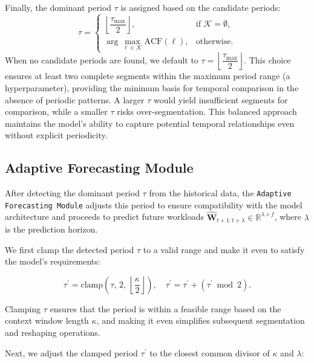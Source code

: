 \documentclass{ieeetmlcn}
\begin{document}
Finally, the dominant period $\tau$ is assigned based on the candidate periods:
\begin{equation}
\label{eq:period_assignment}
\tau = \begin{cases}
    \left\lfloor \dfrac{\tau_{\max}}{2} \right\rfloor, & \text{if } \mathcal{K} = \emptyset, \\[2ex]
    \displaystyle\arg\max_{\ell \in \mathcal{K}} \text{ACF}(\ell), & \text{otherwise}.
\end{cases}
\end{equation}
{\color{blue}
When no candidate periods are found, we default to $\tau = \left\lfloor \dfrac{\tau_{\max}}{2} \right\rfloor$. This choice ensures at least two complete segments within the maximum period range (a hyperparameter), providing the minimum basis for temporal comparison in the absence of periodic patterns. A larger $\tau$ would yield insufficient segments for comparison, while a smaller $\tau$ risks over-segmentation. This balanced approach maintains the model's ability to capture potential temporal relationships even without explicit periodicity.}

\subsection{Adaptive Forecasting Module}
\label{sec:adaptive_forecasting}

After detecting the dominant period $\tau$ from the historical data, the \texttt{Adaptive Forecasting Module} adjusts this period to ensure compatibility with the model architecture and proceeds to predict future workloads $\hat{\mathbf{W}}_{t+1:t+\lambda} \in \mathbb{R}^{\lambda \times f}$, where $\lambda$ is the prediction horizon.

We first clamp the detected period $\tau$ to a valid range and make it even to satisfy the model's requirements:

\begin{equation}
\label{eq:tau_clamp}
\tau^\prime = \text{clamp}\left( \tau,\, 2,\, \left\lfloor \dfrac{\kappa}{2} \right\rfloor \right), \quad \tau^\prime = \tau^\prime + (\tau^\prime \bmod 2).
\end{equation}

Clamping $\tau$ ensures that the period is within a feasible range based on the context window length $\kappa$, and making it even simplifies subsequent segmentation and reshaping operations.

Next, we adjust the clamped period $\tau^\prime$ to the closest common divisor of $\kappa$ and $\lambda$:
\end{document}
